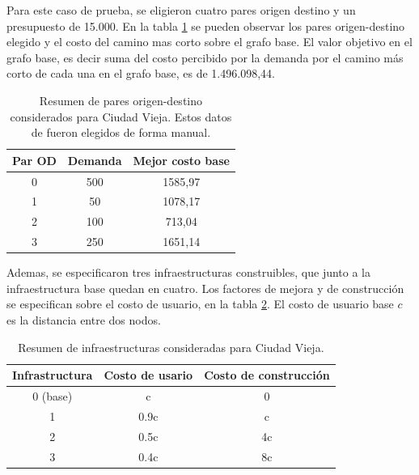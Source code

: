 \documentclass{article}
\begin{document}
  Para este caso de prueba, se eligieron cuatro pares origen destino y un presupuesto de 15.000. En la tabla \ref{table:odsciudadvieja} se pueden observar los pares origen-destino elegido y el costo del camino mas corto sobre el grafo base. El valor objetivo en el grafo base, es decir suma del costo percibido por la demanda por el camino más corto de cada una en el grafo base, es de 1.496.098,44.

  \begin{table}[h!]
    \centering
    \begin{tabular}{ccc}
      \toprule
      Par OD & Demanda & Mejor costo base \\
      \midrule
      0 & 500 & 1585,97 \\
      1 & 50 & 1078,17 \\
      2 & 100 & 713,04 \\
      3 & 250 & 1651,14 \\
      \bottomrule
    \end{tabular}
    \caption{Resumen de pares origen-destino considerados para Ciudad Vieja. Estos datos de fueron elegidos de forma manual.}\label{table:odsciudadvieja}
  \end{table}
  
  Ademas, se especificaron tres infraestructuras construibles, que junto a la infraestructura base quedan en cuatro. Los factores de mejora y de construcción se especifican sobre el costo de usuario, en la tabla \ref{table:infrasciudadvieja}. El costo de usuario base $c$ es la distancia entre dos nodos.

  \begin{table}[h!]
    \centering
    \begin{tabular}{ccc}
      \toprule
      Infrastructura & Costo de usario & Costo de construcción \\
      \midrule
      0 (base) & c & 0 \\
      1 & 0.9c & c \\
      2 & 0.5c & 4c \\
      3 & 0.4c & 8c \\
      \bottomrule
    \end{tabular}
    \caption{Resumen de infraestructuras consideradas para Ciudad Vieja.}\label{table:infrasciudadvieja}
  \end{table}
\end{document}
